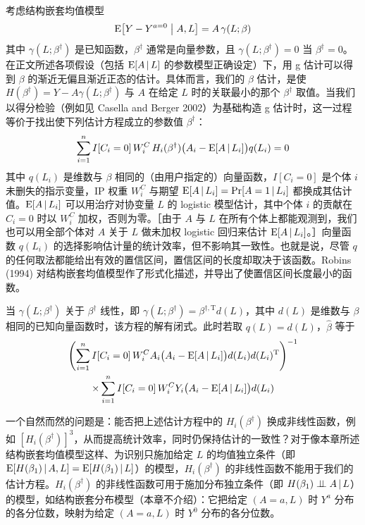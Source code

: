 \begin{techpoint}[结构嵌套均值模型的 g 估计]
考虑结构嵌套均值模型
\[
\mathrm{E}\bigl[Y-Y^{a=0}\bigm|A,L\bigr]=A\,\gamma(L;\beta)
\]
其中 $\gamma(L;\beta^\dagger)$ 是已知函数，$\beta^\dagger$ 通常是向量参数，且 $\gamma(L;\beta^\dagger)=0$ 当 $\beta^\dagger=0$。在正文所述各项假设（包括 $\mathrm{E}[A\,|\, L]$ 的参数模型正确设定）下，用 g 估计可以得到 $\beta$ 的渐近无偏且渐近正态的估计。具体而言，我们的 $\beta$ 估计，是使 $H(\beta^\dagger)=Y-A\gamma(L;\beta^\dagger)$ 与 $A$ 在给定 $L$ 时的关联最小的那个 $\beta^\dagger$ 取值。当我们以得分检验（例如见 Casella and Berger 2002）为基础构造 g 估计时，这一过程等价于找出使下列估计方程成立的参数值 $\beta^\dagger$：
\[
\sum_{i=1}^{n}I[C_i=0]\,W_i^C\,H_i(\beta^\dagger)\bigl(A_i-\mathrm{E}[A\,|\, L_i]\bigr)q(L_i)=0
\]
其中 $q(L_i)$ 是维数与 $\beta$ 相同的（由用户指定的）向量函数，$I[C_i=0]$ 是个体 $i$ 未删失的指示变量，IP 权重 $W_i^C$ 与期望 $\mathrm{E}[A\,|\, L_i]=\Pr[A=1\,|\, L_i]$ 都换成其估计值。$\mathrm{E}[A\,|\, L_i]$ 可以用治疗对协变量 $L$ 的 logistic 模型估计，其中个体 $i$ 的贡献在 $C_i=0$ 时以 $W_i^C$ 加权，否则为零。［由于 $A$ 与 $L$ 在所有个体上都能观测到，我们也可以用全部个体对 $A$ 关于 $L$ 做未加权 logistic 回归来估计 $\mathrm{E}[A\,|\, L_i]$。］向量函数 $q(L_i)$ 的选择影响估计量的统计效率，但不影响其一致性。也就是说，尽管 $q$ 的任何取法都能给出有效的置信区间，置信区间的长度却取决于该函数。Robins (1994) 对结构嵌套均值模型作了形式化描述，并导出了使置信区间长度最小的函数。

当 $\gamma(L;\beta^\dagger)$ 关于 $\beta^\dagger$ 线性，即 $\gamma(L;\beta^\dagger)=\beta^{\dagger,\mathrm T}d(L)$，其中 $d(L)$ 是维数与 $\beta$ 相同的已知向量函数时，该方程的解有闭式。此时若取 $q(L)=d(L)$，$\hat\beta$ 等于
\begin{multline*}
\Biggl(\sum_{i=1}^{n}I[C_i=0]\,W_i^C A_i\bigl(A_i-\mathrm{E}[A\,|\, L_i]\bigr)d(L_i)d(L_i)^{\mathrm T}\Biggr)^{-1}\\
\times\sum_{i=1}^{n}I[C_i=0]\,W_i^C Y_i\bigl(A_i-\mathrm{E}[A\,|\, L_i]\bigr)d(L_i)
\end{multline*}

一个自然而然的问题是：能否把上述估计方程中的 $H_i(\beta^\dagger)$ 换成非线性函数，例如 $[H_i(\beta^\dagger)]^3$，从而提高统计效率，同时仍保持估计的一致性？对于像本章所述结构嵌套均值模型这样、为识别只施加给定 $L$ 的均值独立条件（即 $\mathrm{E}[H(\beta_1)\,|\, A,L]=\mathrm{E}[H(\beta_1)\,|\, L]$）的模型，$H_i(\beta^\dagger)$ 的非线性函数不能用于我们的估计方程。$H_i(\beta^\dagger)$ 的非线性函数可用于施加分布独立条件（即 $H(\beta_1)\perp\!\!\!\perp A\,|\, L$）的模型，如结构嵌套分布模型（本章不介绍）：它把给定 $(A=a,L)$ 时 $Y^a$ 分布的各分位数，映射为给定 $(A=a,L)$ 时 $Y^0$ 分布的各分位数。


\end{techpoint}
